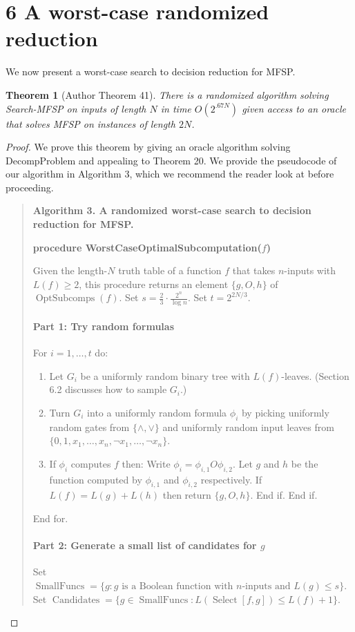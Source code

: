 \documentclass[10pt,a4paper]{article}
\newtheorem{nttheorem}{Theorem}
\newcommand{\Opt}{\operatorname{OptSubcomps}}
\newcommand{\Select}{\operatorname{Select}}
\newcommand{\Candidates}{\operatorname{Candidates}}
\begin{document}
\section*{6 A worst-case randomized reduction}
We now present a worst-case search to decision reduction for MFSP.
\setcounter{nttheorem}{40}
\begin{nttheorem}[Author Theorem 41]
There is a randomized algorithm solving Search-MFSP on inputs of length $N$ in time $O(2^{.67N})$ given access to an oracle that solves MFSP on instances of length $2N$.
\end{nttheorem}
\begin{proof}
We prove this theorem by giving an oracle algorithm solving DecompProblem and appealing to Theorem 20. We provide the pseudocode of our algorithm in Algorithm 3, which we recommend the reader look at before proceeding.
\begin{quote}\textbf{Algorithm 3. A randomized worst-case search to decision reduction for MFSP.}\par
\textbf{procedure WorstCaseOptimalSubcomputation($f$)}\par
Given the length-$N$ truth table of a function $f$ that takes $n$-inputs with $L(f)\geq 2$, this procedure returns an element $\{g,O,h\}$ of $\Opt(f)$. Set $s=\frac 23\cdot\frac{2^n}{\log n}$. Set $t=2^{2N/3}$.
\paragraph{Part 1: Try random formulas}
For $i=1,\ldots,t$ do:
\begin{enumerate}
\item Let $G_i$ be a uniformly random binary tree with $L(f)$-leaves. (Section 6.2 discusses how to sample $G_i$.)
\item Turn $G_i$ into a uniformly random formula $\phi_i$ by picking uniformly random gates from $\{\land,\lor\}$ and uniformly random input leaves from $\{0,1,x_1,\ldots,x_n,\neg x_1,\ldots,\neg x_n\}$.
\item If $\phi_i$ computes $f$ then: Write $\phi_i=\phi_{i,1}O\phi_{i,2}$. Let $g$ and $h$ be the function computed by $\phi_{i,1}$ and $\phi_{i,2}$ respectively. If $L(f)=L(g)+L(h)$ then return $\{g,O,h\}$. End if. End if.
\end{enumerate}
End for.
\paragraph{Part 2: Generate a small list of candidates for $g$}
Set $\operatorname{SmallFuncs}=\{g:g\text{ is a Boolean function with }n\text{-inputs and }L(g)\leq s\}$. Set $\Candidates=\{g\in\operatorname{SmallFuncs}:L(\Select[f,g])\leq L(f)+1\}$.

\end{quote}
\end{proof}
\end{document}
